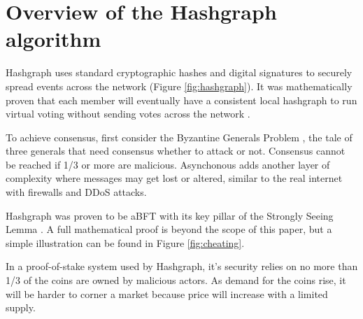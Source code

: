\section{Overview of the Hashgraph algorithm}



Hashgraph uses standard cryptographic hashes and digital signatures to securely spread events across the network (Figure \ref{fig:hashgraph}). It was mathematically proven that each member will eventually have a consistent local hashgraph to run virtual voting without sending votes across the network \cite{baird2016}.

To achieve consensus, first consider the Byzantine Generals Problem \cite{shostak1982byzantine}, the tale of three generals that need consensus whether to attack or not. Consensus cannot be reached if 1/3 or more are malicious. Asynchonous adds another layer of complexity where messages may get lost or altered, similar to the real internet with firewalls and DDoS attacks.


Hashgraph was proven to be aBFT with its key pillar of the Strongly Seeing Lemma \cite{baird2016}. A full mathematical proof is beyond the scope of this paper, but a simple illustration can be found in Figure \ref{fig:cheating}.

In a proof-of-stake system used by Hashgraph, it's security relies on no more than 1/3 of the coins are owned by malicious actors. As demand for the coins rise, it will be harder to corner a market because price will increase with a limited supply.

